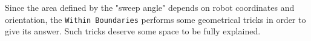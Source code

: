 %
Since the area defined by the "sweep angle" depends on robot 
coordinates and orientation, the \texttt{Within Boundaries}
performs some geometrical tricks in order to give its answer. 
Such tricks deserve some space to be fully explained.
%
\begin{figure}[htp]
  \begin{center}
    \hspace*{15pt}


\end{center}
\end{figure}
